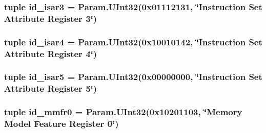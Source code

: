 \label{classArmISA_1_1ArmISA_ae11a7345ff321d9862ad5d191c1b0c00}
\hypertarget{classArmISA_1_1ArmISA_a1c4b03d3168741e37bc59081afabfb0a}{
\subsubsection[{id\_\-isar3}]{\setlength{\rightskip}{0pt plus 5cm}tuple {\bf id\_\-isar3} = Param.UInt32(0x01112131, \char`\"{}Instruction Set Attribute Register 3\char`\"{})}}
\label{classArmISA_1_1ArmISA_a1c4b03d3168741e37bc59081afabfb0a}
\hypertarget{classArmISA_1_1ArmISA_af5e1d9cbcd845b027407c0fabeb71203}{
\subsubsection[{id\_\-isar4}]{\setlength{\rightskip}{0pt plus 5cm}tuple {\bf id\_\-isar4} = Param.UInt32(0x10010142, \char`\"{}Instruction Set Attribute Register 4\char`\"{})}}
\label{classArmISA_1_1ArmISA_af5e1d9cbcd845b027407c0fabeb71203}
\hypertarget{classArmISA_1_1ArmISA_a0d892492ba35f791899a6163154520b7}{
\subsubsection[{id\_\-isar5}]{\setlength{\rightskip}{0pt plus 5cm}tuple {\bf id\_\-isar5} = Param.UInt32(0x00000000, \char`\"{}Instruction Set Attribute Register 5\char`\"{})}}
\label{classArmISA_1_1ArmISA_a0d892492ba35f791899a6163154520b7}
\hypertarget{classArmISA_1_1ArmISA_a259cbe1f754166bd544c3abb11a0c192}{
\subsubsection[{id\_\-mmfr0}]{\setlength{\rightskip}{0pt plus 5cm}tuple {\bf id\_\-mmfr0} = Param.UInt32(0x10201103, \char`\"{}Memory Model Feature Register 0\char`\"{})}}
